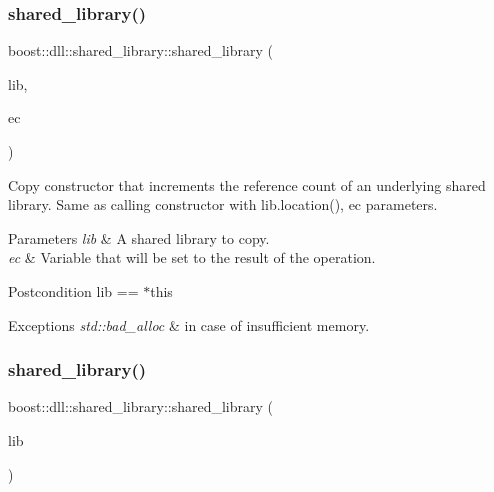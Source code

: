 \subsubsection{\texorpdfstring{shared\+\_\+library()}{shared\_library()}\hspace{0.1cm}{\footnotesize\ttfamily [3/7]}}
{\footnotesize\ttfamily boost\+::dll\+::shared\+\_\+library\+::shared\+\_\+library (\begin{DoxyParamCaption}\item[{const \hyperlink{a01708}{shared\+\_\+library} \&}]{lib,  }\item[{boost\+::system\+::error\+\_\+code \&}]{ec }\end{DoxyParamCaption})\hspace{0.3cm}{\ttfamily [inline]}}

Copy constructor that increments the reference count of an underlying shared library. Same as calling constructor with {\ttfamily lib.\+location(), ec} parameters.


\begin{DoxyParams}{Parameters}
{\em lib} & A shared library to copy. \\
\hline
{\em ec} & Variable that will be set to the result of the operation. \\
\hline
\end{DoxyParams}
\begin{DoxyPostcond}{Postcondition}
lib == $\ast$this 
\end{DoxyPostcond}

\begin{DoxyExceptions}{Exceptions}
{\em std\+::bad\+\_\+alloc} & in case of insufficient memory. \\
\hline
\end{DoxyExceptions}
\mbox{\label{a01708_a829033a804256cb41211865a6c056aff}} 
\subsubsection{\texorpdfstring{shared\+\_\+library()}{shared\_library()}\hspace{0.1cm}{\footnotesize\ttfamily [4/7]}}
{\footnotesize\ttfamily boost\+::dll\+::shared\+\_\+library\+::shared\+\_\+library (\begin{DoxyParamCaption}\item[{B\+O\+O\+S\+T\+\_\+\+R\+V\+\_\+\+R\+EF(\hyperlink{a01708}{shared\+\_\+library})}]{lib }\end{DoxyParamCaption})\hspace{0.3cm}{\ttfamily [inline]}}

